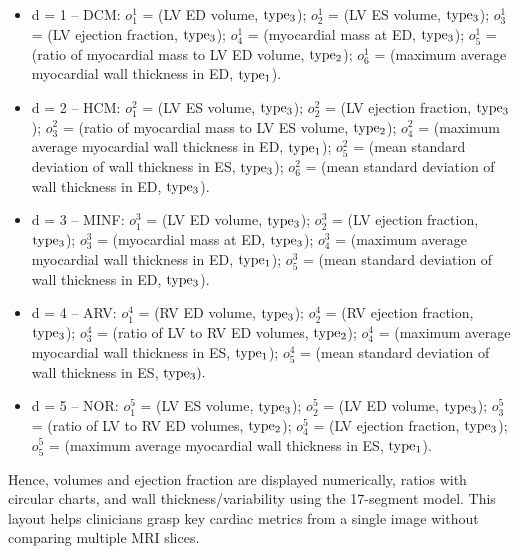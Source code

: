 \documentclass[fleqn,10pt]{wlscirep}
\begin{document}
\begin{itemize}
    \item d = 1 -- DCM: \(o_1^1\) = (LV ED volume, \({\rm{typ}}{{\rm{e}}_3}\)); \(o_2^1\) = (LV ES volume, \({\rm{typ}}{{\rm{e}}_3}\)); \(o_3^1\) = (LV ejection fraction, \({\rm{typ}}{{\rm{e}}_3}\)); \(o_4^1\) = (myocardial mass at ED, \({\rm{typ}}{{\rm{e}}_3}\)); \(o_5^1\) = (ratio of myocardial mass to LV ED volume, \({\rm{typ}}{{\rm{e}}_2}\)); \(o_6^1\) = (maximum average myocardial wall thickness in ED, \({\rm{typ}}{{\rm{e}}_1}\)).
    \item d = 2 -- HCM: \(o_1^2\) = (LV ES volume, \({\rm{typ}}{{\rm{e}}_3}\)); \(o_2^2\) = (LV ejection fraction, \({\rm{typ}}{{\rm{e}}_3}\)); \(o_3^2\) = (ratio of myocardial mass to LV ES volume, \({\rm{typ}}{{\rm{e}}_2}\)); \(o_4^2\) = (maximum average myocardial wall thickness in ED, \({\rm{typ}}{{\rm{e}}_1}\)); \(o_5^2\) = (mean standard deviation of wall thickness in ES, \({\rm{typ}}{{\rm{e}}_3}\)); \(o_6^2\) = (mean standard deviation of wall thickness in ED, \({\rm{typ}}{{\rm{e}}_3}\)).
    \item d = 3 -- MINF: \(o_1^3\) = (LV ED volume, \({\rm{typ}}{{\rm{e}}_3}\)); \(o_2^3\) = (LV ejection fraction, \({\rm{typ}}{{\rm{e}}_3}\)); \(o_3^3\) = (myocardial mass at ED, \({\rm{typ}}{{\rm{e}}_3}\)); \(o_4^3\) = (maximum average myocardial wall thickness in ED, \({\rm{typ}}{{\rm{e}}_1}\)); \(o_5^3\) = (mean standard deviation of wall thickness in ED, \({\rm{typ}}{{\rm{e}}_3}\)).
    \item d = 4 -- ARV: \(o_1^4\) = (RV ED volume, \({\rm{typ}}{{\rm{e}}_3}\)); \(o_2^4\) = (RV ejection fraction, \({\rm{typ}}{{\rm{e}}_3}\)); \(o_3^4\) = (ratio of LV to RV ED volumes, \({\rm{typ}}{{\rm{e}}_2}\)); \(o_4^4\) = (maximum average myocardial wall thickness in ES, \({\rm{typ}}{{\rm{e}}_1}\)); \(o_5^4\) = (mean standard deviation of wall thickness in ES, \({\rm{typ}}{{\rm{e}}_3}).\)
    \item d = 5 -- NOR: \(o_1^5\) = (LV ES volume, \({\rm{typ}}{{\rm{e}}_3}\)); \(o_2^5\) = (LV ED volume, \({\rm{typ}}{{\rm{e}}_3}\)); \(o_3^5\) = (ratio of LV to RV ED volumes, \({\rm{typ}}{{\rm{e}}_2}\)); \(o_4^5\) = (LV ejection fraction, \({\rm{typ}}{{\rm{e}}_3}\)); \(o_5^5\) = (maximum average myocardial wall thickness in ES, \({\rm{typ}}{{\rm{e}}_1}\)).
\end{itemize}

Hence, volumes and ejection fraction are displayed numerically, ratios with circular charts, and wall thickness/variability using the 17-segment model. This layout helps clinicians grasp key cardiac metrics from a single image without comparing multiple MRI slices.
\end{document}
